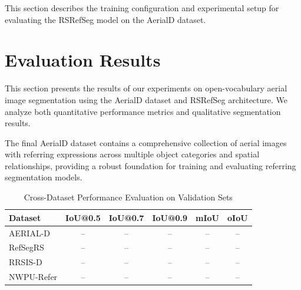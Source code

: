 This section describes the training configuration and experimental setup for evaluating the RSRefSeg model on the AerialD dataset.


\section{Evaluation Results}

This section presents the results of our experiments on open-vocabulary aerial image segmentation using the AerialD dataset and RSRefSeg architecture. We analyze both quantitative performance metrics and qualitative segmentation results.

The final AerialD dataset contains a comprehensive collection of aerial images with referring expressions across multiple object categories and spatial relationships, providing a robust foundation for training and evaluating referring segmentation models.

\begin{table}[H]
\centering
\caption{Cross-Dataset Performance Evaluation on Validation Sets}
\label{tab:cross_dataset_results}
\begin{tabular}{@{}lccccc@{}}
\toprule
\textbf{Dataset} & \textbf{IoU@0.5} & \textbf{IoU@0.7} & \textbf{IoU@0.9} & \textbf{mIoU} & \textbf{oIoU} \\
\midrule
AERIAL-D & -- & -- & -- & -- & -- \\
RefSegRS & -- & -- & -- & -- & -- \\
RRSIS-D & -- & -- & -- & -- & -- \\
NWPU-Refer & -- & -- & -- & -- & -- \\
\bottomrule
\end{tabular}
\end{table}

\begin{table}[H]
\centering
\caption{Comparison with Existing RRSIS Datasets}
\label{tab:dataset_comparison}
\end{table}

